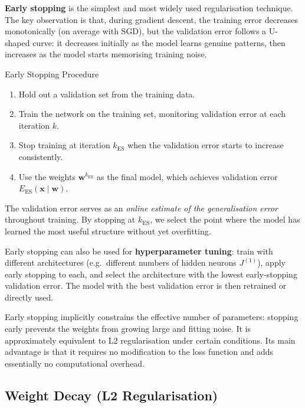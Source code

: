 \documentclass[11pt,a4paper]{article}
\newcommand{\term}[1]{\textcolor{DefGreen}{\textbf{#1}}\index{#1}}
\begin{document}
\term{Early stopping} is the simplest and most widely used regularisation technique. The key observation is that, during gradient descent, the training error decreases monotonically (on average with SGD), but the validation error follows a U-shaped curve: it decreases initially as the model learns genuine patterns, then increases as the model starts memorising training noise.

\begin{algobox}{Early Stopping Procedure}
\begin{enumerate}
  \item Hold out a validation set from the training data.
  \item Train the network on the training set, monitoring validation error at each iteration $k$.
  \item Stop training at iteration $k_{\mathrm{ES}}$ when the validation error starts to increase consistently.
  \item Use the weights $\mathbf{w}^{k_{\mathrm{ES}}}$ as the final model, which achieves validation error $E_{\mathrm{ES}}(\mathbf{x} \mid \mathbf{w})$.
\end{enumerate}
\end{algobox}

The validation error serves as an \emph{online estimate of the generalisation error} throughout training. By stopping at $k_{\mathrm{ES}}$, we select the point where the model has learned the most useful structure without yet overfitting.

Early stopping can also be used for \term{hyperparameter tuning}: train with different architectures (e.g.\ different numbers of hidden neurons $J^{(1)}$), apply early stopping to each, and select the architecture with the lowest early-stopping validation error. The model with the best validation error is then retrained or directly used.

\begin{insightbox}
Early stopping implicitly constrains the effective number of parameters: stopping early prevents the weights from growing large and fitting noise. It is approximately equivalent to L2 regularisation under certain conditions. Its main advantage is that it requires no modification to the loss function and adds essentially no computational overhead.
\end{insightbox}

\subsection{Weight Decay (L2 Regularisation)}
\end{document}
